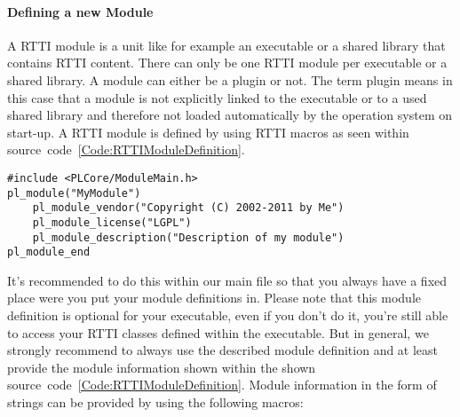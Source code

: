 \paragraph{Defining a new Module}
A \ac{RTTI} module is a unit like for example an executable or a shared library that contains \ac{RTTI} content. There can only be one \ac{RTTI} module per executable or a shared library. A module can either be a plugin or not. The term plugin means in this case that a module is not explicitly linked to the executable or to a used shared library and therefore not loaded automatically by the operation system on start-up. A \ac{RTTI} module is defined by using \ac{RTTI} macros as seen within source~code~\ref{Code:RTTIModuleDefinition}.
\begin{lstlisting}[float=htb,label=Code:RTTIModuleDefinition,caption={Defining a new \ac{RTTI} module}]
#include <PLCore/ModuleMain.h>
pl_module("MyModule")
	pl_module_vendor("Copyright (C) 2002-2011 by Me")
	pl_module_license("LGPL")
	pl_module_description("Description of my module")
pl_module_end
\end{lstlisting}
It's recommended to do this within our main file so that you always have a fixed place were you put your module definitions in. Please note that this module definition is optional for your executable, even if you don't do it, you're still able to access your \ac{RTTI} classes defined within the executable. But in general, we strongly recommend to always use the described module definition and at least provide the module information shown within the shown source~code~\ref{Code:RTTIModuleDefinition}. Module information in the form of strings can be provided by using the following macros:

